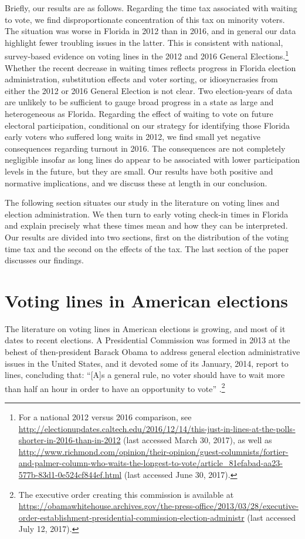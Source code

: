 \documentclass[12pt,titlepage]{article}
\begin{document}
Briefly, our results are as follows.  Regarding the time tax
associated with waiting to vote, we find disproportionate
concentration of this tax on minority voters.  The situation was worse
in Florida in 2012 than in 2016, and in general our data highlight
fewer troubling issues in the latter.  This is consistent with
national, survey-based evidence on voting lines in the 2012 and 2016
General Elections.\footnote{For a national 2012 versus 2016
  comparison, see
  \url{http://electionupdates.caltech.edu/2016/12/14/this-just-in-lines-at-the-polls-shorter-in-2016-than-in-2012}
  (last accessed March 30, 2017), as well as
  \url{http://www.richmond.com/opinion/their-opinion/guest-columnists/fortier-and-palmer-column-who-waits-the-longest-to-vote/article_81efabad-aa23-577b-83d1-0e524cf844ef.html}
  (last accessed June 30, 2017).}  Whether the recent decrease in
waiting times reflects progress in Florida election administration,
substitution effects and voter sorting, or idiosyncrasies from either
the 2012 or 2016 General Election is not clear.  Two election-years of
data are unlikely to be sufficient to gauge broad progress in a state
as large and heterogeneous as Florida.  Regarding the effect of
waiting to vote on future electoral participation, conditional on our
strategy for identifying those Florida early voters who suffered long
waits in 2012, we find small yet negative consequences regarding
turnout in 2016. The consequences are not completely negligible
insofar as long lines do appear to be associated with lower
participation levels in the future, but they are small.  Our results
have both positive and normative implications, and we discuss these at
length in our conclusion.

The following section situates our study in the literature on voting
lines and election administration.  We then turn to early voting
check-in times in Florida and explain precisely what these times mean
and how they can be interpreted.  Our results are divided into two
sections, first on the distribution of the voting time tax and the
second on the effects of the tax.  The last section of the paper
discusses our findings.

\section*{Voting lines in American elections}

The literature on voting lines in American elections is growing, and
most of it dates to recent elections.  A Presidential Commission was
formed in 2013 at the behest of then-president Barack Obama to address
general election administrative issues in the United States, and it
devoted some of its January, 2014, report to lines, concluding that:
``[A]s a general rule, no voter should have to wait more than half an
hour in order to have an opportunity to vote'' \citep[p.\
13,][]{pcea:2014}.\footnote{The executive order creating this
  commission is available at
  \url{https://obamawhitehouse.archives.gov/the-press-office/2013/03/28/executive-order-establishment-presidential-commission-election-administr}
  (last accessed July 12, 2017).}
\end{document}
